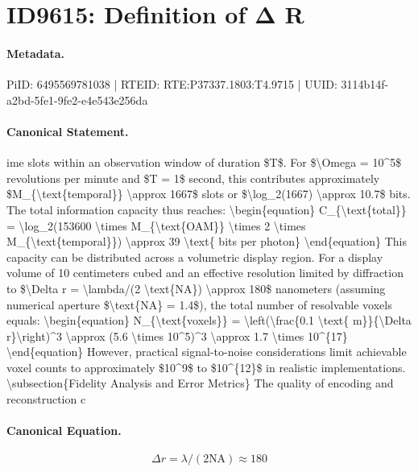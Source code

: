 \section*{ID9615: Definition of Δ R}
\paragraph{Metadata.}
PiID: 6495569781038 | RTEID: RTE:P37337.1803:T4.9715 | UUID: 3114b14f-a2bd-5fe1-9fe2-e4e543e256da

\paragraph{Canonical Statement.}
ime slots within an observation window of duration \$T\$. For \$\textbackslash{}Omega = 10\textasciicircum{}5\$ revolutions per minute and \$T = 1\$ second, this contributes approximately \$M\_\{\textbackslash{}text\{temporal\}\} \textbackslash{}approx 1667\$ slots or \$\textbackslash{}log\_2(1667) \textbackslash{}approx 10.7\$ bits. The total information capacity thus reaches: \textbackslash{}begin\{equation\} C\_\{\textbackslash{}text\{total\}\} = \textbackslash{}log\_2(153600 \textbackslash{}times M\_\{\textbackslash{}text\{OAM\}\} \textbackslash{}times 2 \textbackslash{}times M\_\{\textbackslash{}text\{temporal\}\}) \textbackslash{}approx 39 \textbackslash{}text\{ bits per photon\} \textbackslash{}end\{equation\} This capacity can be distributed across a volumetric display region. For a display volume of 10 centimeters cubed and an effective resolution limited by diffraction to \$\textbackslash{}Delta r = \textbackslash{}lambda/(2 \textbackslash{}text\{NA\}) \textbackslash{}approx 180\$ nanometers (assuming numerical aperture \$\textbackslash{}text\{NA\} = 1.4\$), the total number of resolvable voxels equals: \textbackslash{}begin\{equation\} N\_\{\textbackslash{}text\{voxels\}\} = \textbackslash{}left(\textbackslash{}frac\{0.1 \textbackslash{}text\{ m\}\}\{\textbackslash{}Delta r\}\textbackslash{}right)\textasciicircum{}3 \textbackslash{}approx (5.6 \textbackslash{}times 10\textasciicircum{}5)\textasciicircum{}3 \textbackslash{}approx 1.7 \textbackslash{}times 10\textasciicircum{}\{17\} \textbackslash{}end\{equation\} However, practical signal-to-noise considerations limit achievable voxel counts to approximately \$10\textasciicircum{}9\$ to \$10\textasciicircum{}\{12\}\$ in realistic implementations. \textbackslash{}subsection\{Fidelity Analysis and Error Metrics\} The quality of encoding and reconstruction c

\paragraph{Canonical Equation.}
\[
\Delta r = \lambda/(2 \text{NA}) \approx 180
\]

